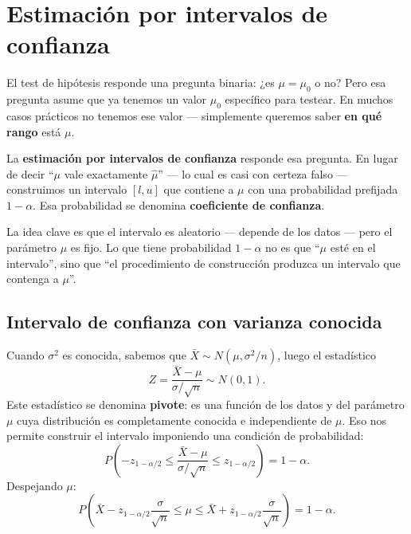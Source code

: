 \documentclass[12pt, a4paper]{book}
\numberwithin{equation}{chapter}
\begin{document}
\section{Estimaci\'{o}n por intervalos de
	confianza}

El test de hip\'{o}tesis responde una pregunta
binaria: ¿es $\mu = \mu_0$ o no? Pero esa
pregunta asume que ya tenemos un valor $\mu_0$
espec\'{i}fico para testear. En muchos casos
pr\'{a}cticos no tenemos ese valor --- simplemente
queremos saber \textbf{en qu\'{e} rango} est\'{a}
$\mu$.

La \textbf{estimaci\'{o}n por intervalos de
	confianza} responde esa pregunta. En lugar de
decir ``$\mu$ vale exactamente $\hat{\mu}$''
--- lo cual es casi con certeza falso ---
construimos un intervalo $[l, u]$ que contiene
a $\mu$ con una probabilidad prefijada
$1 - \alpha$. Esa probabilidad se denomina
\textbf{coeficiente de confianza}.

La idea clave es que el intervalo es aleatorio
--- depende de los datos --- pero el par\'{a}metro
$\mu$ es fijo. Lo que tiene probabilidad
$1 - \alpha$ no es que ``$\mu$ est\'{e} en el
intervalo'', sino que ``el procedimiento de
construcci\'{o}n produzca un intervalo que
contenga a $\mu$''.

\subsection{Intervalo de confianza con varianza
	conocida}

Cuando $\sigma^2$ es conocida, sabemos que
$\bar{X} \sim N(\mu, \sigma^2/n)$, luego el
estad\'{i}stico
\[
Z = \frac{\bar{X} - \mu}{\sigma/\sqrt{n}}
\sim N(0,1).
\]
Este estad\'{i}stico se denomina
\textbf{pivote}: es una funci\'{o}n de los
datos y del par\'{a}metro $\mu$ cuya
distribuci\'{o}n es completamente conocida
e independiente de $\mu$. Eso nos permite
construir el intervalo imponiendo una
condici\'{o}n de probabilidad:
\[
P\!\left(-z_{1-\alpha/2} \leq
\frac{\bar{X} - \mu}{\sigma/\sqrt{n}}
\leq z_{1-\alpha/2}\right) = 1 - \alpha.
\]
Despejando $\mu$:
\[
P\!\left(\bar{X} - z_{1-\alpha/2}
\frac{\sigma}{\sqrt{n}} \leq \mu \leq
\bar{X} + z_{1-\alpha/2}
\frac{\sigma}{\sqrt{n}}\right)
= 1 - \alpha.
\]
\end{document}
